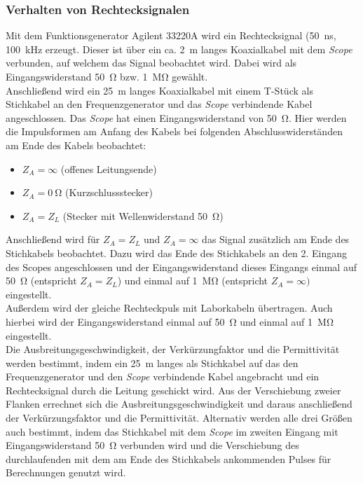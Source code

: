 \documentclass[a4paper,twoside,final]{article}
\begin{document}
\subsubsection{Verhalten von Rechtecksignalen}
Mit dem Funktionsgenerator Agilent 33220A wird ein Rechtecksignal (\SI{50}{\nano\second}, \SI{100}{\kilo\hertz} erzeugt. Dieser ist über ein ca. \SI{2}{\metre} langes Koaxialkabel mit dem \textit{Scope} verbunden, auf welchem das Signal beobachtet wird. Dabei wird als Eingangswiderstand \SI{50}{\ohm} bzw. \SI{1}{\mega\ohm} gewählt.\\
Anschließend wird ein \SI{25}{\metre} langes Koaxialkabel mit einem T-Stück als Stichkabel an den Frequenzgenerator und das \textit{Scope} verbindende Kabel angeschlossen. Das \textit{Scope} hat einen Eingangswiderstand von \SI{50}{\ohm}. Hier werden die Impulsformen am Anfang des Kabels bei folgenden Abschlusswiderständen am Ende des Kabels beobachtet:
\begin{itemize}
  \item $Z_A = \infty$ (offenes Leitungsende)
  \item $Z_A = \SI{0}{\ohm}$ (Kurzschlussstecker)
  \item $Z_A = Z_L$ (Stecker mit Wellenwiderstand \SI{50}{\ohm})
\end{itemize}
Anschließend wird für $Z_A=Z_L$ und $Z_A = \infty$ das Signal zusätzlich am Ende des Stichkabels beobachtet. Dazu wird das Ende des Stichkabels an den 2. Eingang des Scopes angeschlossen und der Eingangswiderstand dieses Eingangs einmal auf \SI{50}{\ohm} (entspricht $Z_A = Z_L$) und einmal auf \SI{1}{\mega\ohm} (entspricht $Z_A = \infty)$ eingestellt. \\

Außerdem wird der gleiche Rechteckpuls mit Laborkabeln übertragen. Auch hierbei wird der Eingangswiderstand einmal auf \SI{50}{\ohm} und einmal auf \SI{1}{\mega\ohm} eingestellt. \\

Die Ausbreitungsgeschwindigkeit, der Verkürzungfaktor und die Permittivität werden bestimmt, indem ein \SI{25}{\metre} langes als Stichkabel auf das den Frequenzgenerator und den \textit{Scope} verbindende Kabel angebracht und ein Rechtecksignal durch die Leitung geschickt wird. Aus der Verschiebung zweier Flanken errechnet sich die Ausbreitungsgeschwindigkeit und daraus anschließend der Verkürzungsfaktor und die Permittivität. Alternativ werden alle drei Größen auch bestimmt, indem das Stichkabel mit dem \textit{Scope} im zweiten Eingang mit Eingangswiderstand \SI{50}{\ohm} verbunden wird und die Verschiebung des durchlaufenden mit dem am Ende des Stichkabels ankommenden Pulses für Berechnungen genutzt wird.
\end{document}
